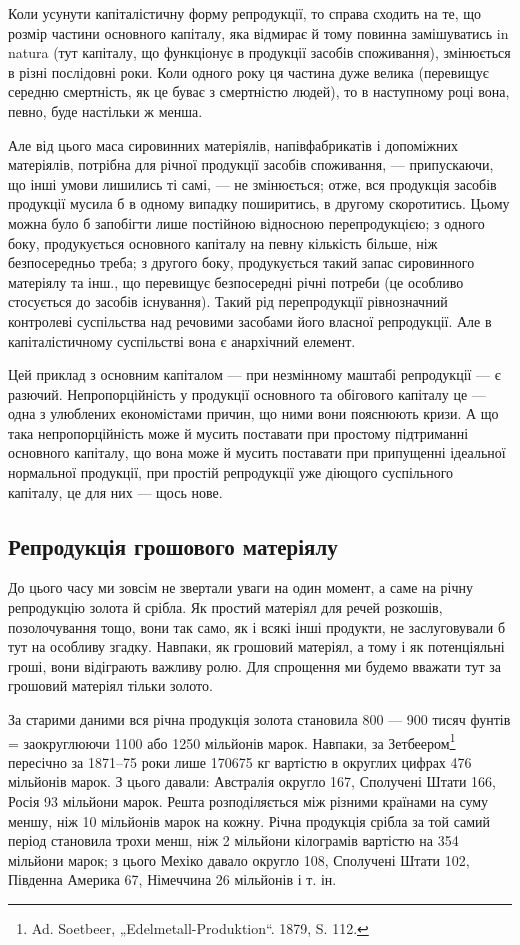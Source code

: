 Коли усунути капіталістичну форму репродукції, то справа сходить
на те, що розмір частини основного капіталу, яка відмирає й тому
повинна замішуватись in natura (тут капіталу, що функціонує в продукції
засобів споживання), змінюється в різні послідовні роки. Коли одного
року ця частина дуже велика (перевищує середню смертність, як це
буває з смертністю людей), то в наступному році вона, певно, буде
настільки ж менша.

Але від цього маса сировинних матеріялів, напівфабрикатів і допоміжних
матеріялів, потрібна для річної продукції засобів споживання, — припускаючи,
що інші умови лишились ті самі, — не змінюється; отже, вся
продукція засобів продукції мусила б в одному випадку поширитись, в
другому скоротитись. Цьому можна було б запобігти лише постійною
відносною перепродукцією; з одного боку, продукується основного
капіталу на певну кількість більше, ніж безпосередньо треба; з другого
боку, продукується такий запас сировинного матеріялу та інш., що
перевищує безпосередні річні потреби (це особливо стосується до засобів
існування). Такий рід перепродукції рівнозначний контролеві суспільства
над речовими засобами його власної репродукції. Але в капіталістичному
суспільстві вона є анархічний елемент.

Цей приклад з основним капіталом — при незмінному маштабі репродукції
— є разючий. Непропорційність у продукції основного та обігового
капіталу це — одна з улюблених економістами причин, що ними вони
пояснюють кризи. А що така непропорційність може й мусить поставати
при простому підтриманні основного капіталу, що вона може й
мусить поставати при припущенні ідеальної нормальної продукції, при
простій репродукції уже діющого суспільного капіталу, це для них — щось
нове.

\subsection{Репродукція грошового матеріялу}

До цього часу ми зовсім не звертали уваги на один момент, а саме
на річну репродукцію золота й срібла. Як простий матеріял для речей
розкошів, позолочування тощо, вони так само, як і всякі інші продукти,
не заслуговували б тут на особливу згадку. Навпаки, як грошовий
матеріял, а тому і як потенціяльні гроші, вони відіграють важливу ролю.
Для спрощення ми будемо вважати тут за грошовий матеріял тільки золото.

За старими даними вся річна продукція золота становила 800 —
900 тисяч фунтів = заокруглюючи 1100 або 1250 мільйонів марок. Навпаки,
за Зетбеером\footnote{Ad. Soetbeer, „Edelmetall-Produktion“. 1879, S. 112.} пересічно за 1871--75 роки лише 170675 кг вартістю
в округлих цифрах 476 мільйонів марок. З цього давали: Австралія
округло 167, Сполучені Штати 166, Росія 93 мільйони марок. Решта
розподіляється між різними країнами на суму меншу, ніж 10 мільйонів
марок на кожну. Річна продукція срібла за той самий період становила
трохи менш, ніж 2 мільйони кілограмів вартістю на 354 мільйони
марок; з цього Мехіко давало округло 108, Сполучені Штати 102,
Південна Америка 67, Німеччина 26 мільйонів і т. ін.

